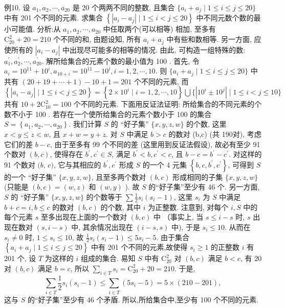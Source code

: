 例10. 设 $a_1, a_2, \cdots, a_{20}$ 是 20 个两两不同的整数, 且集合 $ \{a_i+a_j \mid 1 \leqslant  i \leqslant j \leqslant 20\}$ 中有 201 个不同的元素.
求集合 $\left\{\left|a_i-a_j\right| \mid 1 \leqslant i<j \leqslant 20\right\}$ 中不同元数个数的最小可能值.
分析:从 $a_1, a_2, \cdots, a_{20}$ 中任取两个(可以相等) 相加, 至多有 $\mathrm{C}_{20}^2+ 20=210$ 个不同的和, 由题设知, 所有 $a_i+a_j$ 中有些和数相等.
另一方面, 应使所有的 $\left|a_i-a_j\right|$ 中出现尽可能多的相等的情况.
由此, 可构造一组特殊的数: $a_1^{\prime}, a_2^{\prime}, \cdots, a_{20}^{\prime}$.
解所给集合的元素个数的最小值为 100 .
首先, 令 $a_i=10^{11}+10^i, a_{10+i}=10^{11}-10^i, i=1,2, \cdots, 10$. 则 $\{a_i+a_j \mid 1 \leqslant i \leqslant j \leqslant 20\}$ 中共有 $(20+19+\cdots+1)-10+1=201$ 个不同的元素, 而 $\left\{\left|a_i-a_j\right| \mid 1 \leqslant i<j \leqslant 20\right\}=\left\{2 \times 10^i \mid i=1,2, \cdots, 10\right\} \bigcup\{\left|10^i \pm 10^j\right| \mid 1 \leqslant i<j \leqslant 10\}$ 共有 $10+2 \mathrm{C}_{10}^2=100$ 个不同的元素.
下面用反证法证明: 所给集合的不同元素的个数不小于 100 .
若存在一个使所给集合的元素个数小于 100 的集合 $S=\left\{a_1, a_2, \cdots, a_{20}\right\}$. 我们计算 $S$ 的 “好子集” $\{x, y, z, w\}$ 的个数, 这里 $x<y \leqslant z<w$, 且 $x+w=y+z$.
对 $S$ 中满足 $b>c$ 的数对 (b,c) (共 190对), 考虑它们的差 $b-c$, 由于至多有 99 个不同的差 (这里用到反证法假设), 故必有至少 91 个数对 $(b, c)$, 使得存在 $b^{\prime}, c^{\prime} \in S$, 满足 $b^{\prime}<b, c^{\prime}<c$, 且 $b-c=b^{\prime}-c^{\prime}$. 对这样的 91 个数对 $(b$, $c)$, 它与其相应的 $b^{\prime}, c^{\prime}$ 形成 $S$ 的一个 4 元集 $\left\{b, c, b^{\prime}, c^{\prime}\right\}$, 可得到 $S$ 的一个 “好子集” $\{x, y, z, w\}$, 且至多两个数对 $(b, c)$ 形成相同的子集 $\{x, y, z, w\}$ (只能是 $(b, c)=(w, z)$ 和 $(w, y)$ ). 故 $S$ 的“好子集”至少有 46 个.
另一方面, $S$ 的 “好子集” $\{x, y, z, w\}$ 的个数等于 $\sum \frac{1}{2} s_i\left(s_i-1\right)$, 这里 $s_i$ 为 $S$ 中满足 $b+c=i, b \leqslant c$ 的数对 $(b, c)$ 的个数, 其中 $i$ 为正整数.
注意到, 对每个 $i, S$ 中的每个元素 $s$ 至多出现在上面的一个数对 $(b, c)$ 中 （事实上, 当 $s \leqslant i-s$ 时, $s$ 出现在数对 $(s, i-s)$ 中, 其余情况出现在 $(i-s, s)$ 中), 于是 $s_i \leqslant 10$. 从而在 $s_i \neq 0$ 时, $1 \leqslant s_i \leqslant 10$, 故 $\frac{1}{2} s_i\left(s_i-1\right) \leqslant 5 s_i-5$. 由于集合 $\left\{a_i+a_j \mid 1 \leqslant i \leqslant j \leqslant 20\right\}$ 中有 201 个不同的元素,故使得 $s_i \geqslant 1$ 的正整数 $i$ 有 201 个, 设 $T$ 为这样的 $i$ 组成的集合.
易知 $S$ 中有 $\mathrm{C}_{20}^2$ 对 $(b, c)$ 满足 $b<c$, 有 20 对 $(b, c)$ 满足 $b=c$, 所以 $\sum_{i \in T} s_i=\mathrm{C}_{20}^2+20=210$. 于是,
$$
\sum_{i \in T} \frac{1}{2} s_i\left(s_i-1\right) \leqslant \sum_{i \in T}\left(5 s_i-5\right)=5 \times(210-201),
$$
这与 $S$ 的“好子集”至少有 46 个矛盾.
所以,所给集合中,至少有 100 个不同的元素.


